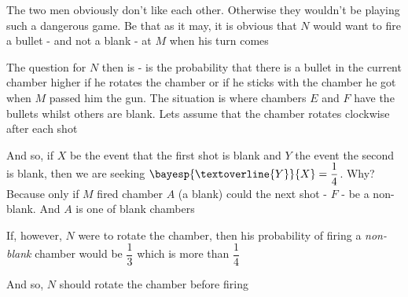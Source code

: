 \begin{solution}
	The two men obviously don't like each other. Otherwise they wouldn't be playing such 
	a dangerous game. Be that as it may, it is obvious that $N$ would want to fire a bullet - and not a 
	blank - at $M$ when his turn comes
	
	The question for $N$ then is - is the probability that there is a bullet in the current
	chamber higher if he rotates the chamber or if he sticks with the chamber he got when $M$
	passed him the gun. The situation is \asif where chambers $E$ and $F$ have the bullets whilst 
	others are blank. Lets assume that the chamber rotates clockwise after each shot
	
	And so, if $X$ be the event that the first shot is blank and $Y$ the event the second
	is blank, then we are seeking $\bayesp{\textoverline{Y}}{X} = \dfrac{1}{4}$. Why? Because 
	only if $M$ fired chamber $A$ (a blank) could the next shot - $F$ - be a non-blank. And $A$ 
	is one of  blank chambers
	
	If, however, $N$ were to rotate the chamber, then his probability of firing a \textit{non-blank} 
	chamber would be $\dfrac{1}{3}$ which is more than $\dfrac{1}{4}$
	
	And so, $N$ should rotate the chamber before firing
	
\end{solution}
